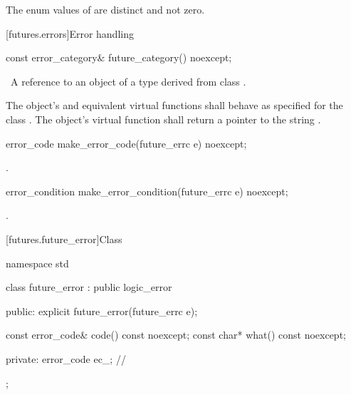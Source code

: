 \pnum
The enum values of  are distinct and not zero.

[futures.errors]{Error handling}

%
\begin{itemdecl}
const error_category& future_category() noexcept;
\end{itemdecl}

\begin{itemdescr}
\pnum
\returns\ A reference to an object of a type derived from class .

\pnum
The object's  and equivalent virtual functions shall
behave as specified for the class . The object's 
virtual function shall return a pointer to the string .
\end{itemdescr}

%
\begin{itemdecl}
error_code make_error_code(future_errc e) noexcept;
\end{itemdecl}

\begin{itemdescr}
\pnum
\returns {}.
\end{itemdescr}

%
\begin{itemdecl}
error_condition make_error_condition(future_errc e) noexcept;
\end{itemdecl}

\begin{itemdescr}
\pnum
\returns {}.
\end{itemdescr}

[futures.future_error]{Class }

%
\begin{codeblock}
namespace std {
  class future_error : public logic_error {
  public:
    explicit future_error(future_errc e);

    const error_code& code() const noexcept;
    const char*       what() const noexcept;

  private:
    error_code ec_;             // \expos
  };
}
\end{codeblock}

